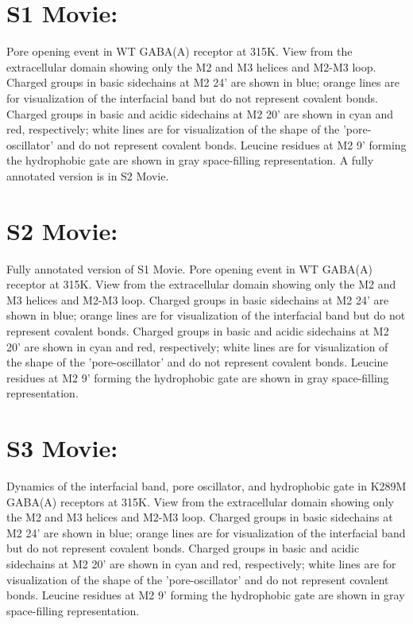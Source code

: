 \documentclass[9pt,onecolumn,oneside,lineno]{pnas-new}
\begin{document}
\section*{S1 Movie:}  Pore opening event in WT GABA(A) receptor at 315K. View from the extracellular domain showing only the M2 and M3 helices and M2-M3 loop.  Charged groups in basic sidechains at M2 24' are shown in blue; orange lines are for visualization of the interfacial band but do not represent covalent bonds.  Charged groups in basic and acidic sidechains at M2 20' are shown in cyan and red, respectively; white lines are for visualization of the shape of the 'pore-oscillator' and do not represent covalent bonds. Leucine residues at M2 9' forming the hydrophobic gate are shown in gray space-filling representation. A fully annotated version is in S2 Movie. 

\section*{S2 Movie:} Fully annotated version of S1 Movie.  Pore opening event in WT GABA(A) receptor at 315K. View from the extracellular domain showing only the M2 and M3 helices and M2-M3 loop.  Charged groups in basic sidechains at M2 24' are shown in blue; orange lines are for visualization of the interfacial band but do not represent covalent bonds.  Charged groups in basic and acidic sidechains at M2 20' are shown in cyan and red, respectively; white lines are for visualization of the shape of the 'pore-oscillator' and do not represent covalent bonds. Leucine residues at M2 9' forming the hydrophobic gate are shown in gray space-filling representation. 

\section*{S3 Movie:} Dynamics of the interfacial band, pore oscillator, and hydrophobic gate in K289M GABA(A) receptors at 315K. View from the extracellular domain showing only the M2 and M3 helices and M2-M3 loop.  Charged groups in basic sidechains at M2 24' are shown in blue; orange lines are for visualization of the interfacial band but do not represent covalent bonds.  Charged groups in basic and acidic sidechains at M2 20' are shown in cyan and red, respectively; white lines are for visualization of the shape of the 'pore-oscillator' and do not represent covalent bonds. Leucine residues at M2 9' forming the hydrophobic gate are shown in gray space-filling representation. 
\end{document}
